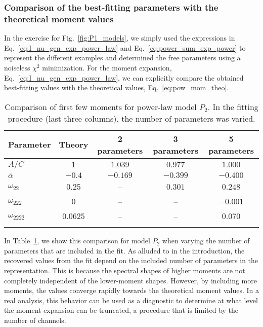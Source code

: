 \documentclass[usenatbib]{mn2e}
\begin{document}
\subsubsection{Comparison of the best-fitting parameters with the theoretical moment values}
\label{sec:pow_exercise}
In the exercise for Fig.~\ref{fig:P1_models}, we simply used the expressions in Eq.~\eqref{eq:I_nu_gen_exp_power_law} and Eq.~\eqref{eq:power_sum_exp_power} to represent the different examples and determined the free parameters using a noiseless $\chi^2$ minimization. For the moment expansion, Eq.~\eqref{eq:I_nu_gen_exp_power_law}, we can explicitly compare the obtained best-fitting values with the theoretical values, Eq.~\eqref{eq:pow_mom_theo}. 
\begin{table}
\centering
\caption{Comparison of first few moments for power-law model $P_2$. In the fitting procedure (last three columns), the number of parameters was varied.}
\begin{tabular}{lcccc}
\hline
\hline
Parameter & Theory & 2 parameters & 3 parameters & 5 parameters
\\[1pt]
\hline
$\bar{A}/C$ & $1$ & $1.039$ & $0.977$ & $1.000$
\\[1pt]
$\bar{\alpha}$ & $-0.4$ & $-0.169$ & $-0.399$ & $-0.400$
\\[1pt]
$\omega_{22}$ & $0.25$ & -- & $0.301$ & $0.248$
\\[1pt]
$\omega_{222}$ & $0$ & -- & -- & $-0.001$
\\[1pt]
$\omega_{2222}$ & $0.0625$ & -- & -- & $0.070$
\\[1pt]
\hline
\hline
\label{tab:one}
\end{tabular}
\end{table}
In Table~\ref{tab:one}, we show this comparison for model $P_2$ when varying the number of parameters that are included in the fit. As alluded to in the introduction, the recovered values from the fit depend on the included number of parameters in the representation. This is because the spectral shapes of higher moments are not completely independent of the lower-moment shapes. However, by including more moments, the values converge rapidly towards the theoretical moment values. In a real analysis, this behavior can be used as a diagnostic to determine at what level the moment expansion can be truncated, a procedure that is limited by the number of channels.

\vspace{-2mm}
\end{document}
